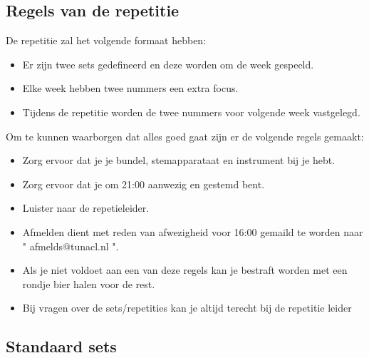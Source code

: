 \subsection*{Regels van de repetitie}
\footnotesize
De repetitie zal het volgende formaat hebben:
\begin{itemize}
\item Er zijn twee sets gedefineerd en deze worden om de week gespeeld.
\item Elke week hebben twee nummers een extra focus.
\item Tijdens de repetitie worden de twee nummers voor volgende week vastgelegd.
\end{itemize}

Om te kunnen waarborgen dat alles goed gaat zijn er de volgende regels gemaakt:
\begin{itemize}
\item Zorg ervoor dat je je bundel, stemapparataat en instrument bij je hebt.
\item Zorg ervoor dat je om 21:00 aanwezig en gestemd bent.
\item Luister naar de repetieleider.
\item Afmelden dient met reden van afwezigheid voor 16:00 gemaild te worden naar " afmelds@tunacl.nl ".
\item Als je niet voldoet aan een van deze regels kan je bestraft worden met een rondje bier halen voor de rest.

\item Bij vragen over de sets/repetities kan je altijd terecht bij de repetitie leider
\end{itemize}
\vfill
\subsection*{Standaard sets}
\begin{framed}
	\begin{minipage}[b][105mm][c]{148mm}%
		\hfill\vspace{105mm}%
	\end{minipage}%
\end{framed}
\normalsize
